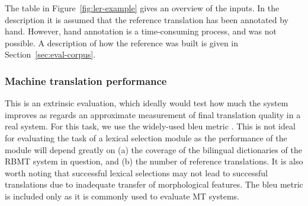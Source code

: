 \documentclass[11pt]{article}
\newcommand{\todomlf}[1]{\renewcommand{\baselinestretch}{0.55}\todo{\scriptsize\sf MLF: #1}\renewcommand{\baselinestretch}{1.0}}
\begin{document}


The table in Figure~\ref{fig:ler-example} gives an
overview of the inputs.%
In the description it is assumed that the
reference translation has been annotated by hand. However, hand
annotation is a time-consuming process, and was not possible. A
description of how the reference was built is given in
Section~\ref{sec:eval-corpus}.

\subsubsection{Machine translation performance} 

This is an extrinsic evaluation, which ideally would test how much the
system improves as regards an approximate measurement of final
translation quality in a real system. For this task, we use the
widely-used {\sc bleu} metric \citep{papineni02}.
This is not ideal for evaluating the
task of a lexical selection module as the performance of the module
will depend greatly on (a) the coverage of the bilingual dictionaries
of the RBMT system in question, and (b) the number of reference
translations. It is also worth noting that successful lexical
selections may not lead to successful translations due to inadequate
transfer of morphological features.
The {\sc bleu} metric  is
included only as it is commonly used to evaluate MT systems. 

\end{document}
